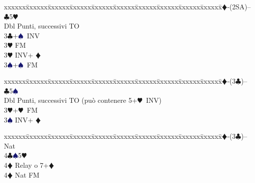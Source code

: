 \documentclass[a4paper,italian]{article}
\newcommand{\BC}{\textcolor{OliveGreen}{$\clubsuit$}}
\newcommand{\BD}{\textcolor{RedOrange}{$\vardiamondsuit$}}
\newcommand{\BH}{\textcolor{Red2}{$\varheartsuit${}}}
\newcommand{\BS}{\textcolor{MidnightBlue}{$\spadesuit${}}}
\newenvironment{bidtable}
{\begin{tabbing}

    xxxxxx\=xxxxxx\=xxxxxx\=xxxxxx\=xxxxxx\=xxxxxx\=xxxxxx\=xxxxxx\=xxxxxx\=xxxxxx\=\kill}
{\end{tabbing} }%
\begin{document}
\begin{multicols}{2}
                                        \columnbreak

                                        \begin{bidtable}
                                            1\BD-(2SA)-- \> \BC 5\BH \+\\
                                            Dbl \> Punti, successivi TO\\
                                            3\BC {}+\BS\ INV\+\\
                                            3\BH \> FM\-\\
                                            3\BH \> INV+ \BD \\
                                            3\BS {}+\BS\ FM\-
                                        \end{bidtable}
                                        \begin{bidtable}
                                            1\BD-(3\BC)-- \> \BC 5\BS \+\\
                                            Dbl \> Punti, successivi TO (può contenere 5+\BH\ INV)\\
                                            3\BH {}+\BH\ FM\\
                                            3\BS \> INV+ \BD \-
                                        \end{bidtable}
                                        \begin{bidtable}
                                            1\BD-(3\BC)-- \> \> Nat\+\\
                                            4\BC {}\BS 5\BH \+\\
                                            4\BD \> Relay o 7+\BD \-\\
                                            4\BD \> Nat FM\-
                                        \end{bidtable}


\end{multicols}
\end{document}
